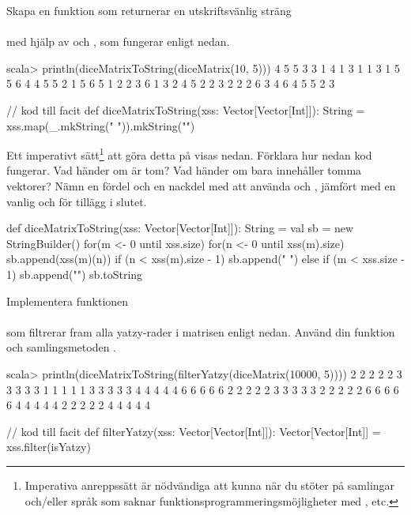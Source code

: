 \Subtask Skapa en funktion som returnerar en utskriftsvänlig sträng \\  \\med hjälp av  och , som fungerar enligt nedan. 
\begin{REPL}
scala> println(diceMatrixToString(diceMatrix(10, 5)))
4 5 5 3 3
1 4 1 3 1
1 3 1 5 5
6 4 4 5 5
2 1 5 6 5
1 2 2 3 6
1 3 2 4 5
2 2 3 2 2
2 6 3 4 6
4 5 5 2 3

\end{REPL}
\begin{Code}
// kod till facit
def diceMatrixToString(xss: Vector[Vector[Int]]): String = 
  xss.map(_.mkString(" ")).mkString("\n")
\end{Code}


\Subtask\Pen Ett imperativt sätt\footnote{Imperativa anreppssätt är nödvändiga att kunna när du stöter på samlingar och/eller språk som saknar funktionsprogrammeringsmöjligheter med ,  etc.} att göra detta på visas nedan. Förklara hur nedan kod fungerar. Vad händer om  är tom? Vad händer om  bara innehåller tomma vektorer? Nämn en fördel och en nackdel med att använda  och , jämfört med en vanlig  och \code{+} för tillägg i slutet.
\begin{Code}
def diceMatrixToString(xss: Vector[Vector[Int]]): String = {
  val sb = new StringBuilder()
  for(m <- 0 until xss.size) {
    for(n <- 0 until xss(m).size) { 
      sb.append(xss(m)(n))
      if (n < xss(m).size - 1) sb.append(" ") 
      else if (m < xss.size - 1) sb.append("\n")
    }
  }
  sb.toString
}
\end{Code}

\Subtask Implementera funktionen \\  \\ som filtrerar fram alla yatzy-rader i matrisen  enligt nedan. Använd din funktion  och samlingsmetoden . 
\begin{REPL}
scala> println(diceMatrixToString(filterYatzy(diceMatrix(10000, 5))))
2 2 2 2 2
3 3 3 3 3
1 1 1 1 1
3 3 3 3 3
4 4 4 4 4
6 6 6 6 6
2 2 2 2 2
3 3 3 3 3
2 2 2 2 2
6 6 6 6 6
4 4 4 4 4
2 2 2 2 2
4 4 4 4 4

\end{REPL}

\begin{Code}
// kod till facit
def filterYatzy(xss: Vector[Vector[Int]]): Vector[Vector[Int]] = 
  xss.filter(isYatzy)
\end{Code}

